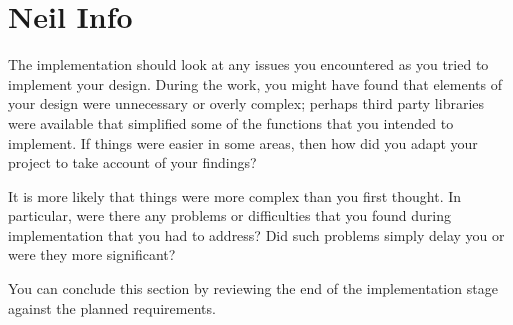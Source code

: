 \section{Neil Info}

The implementation should look at any issues you encountered as you tried to implement your design. During the work, you might have found that elements of your design were unnecessary or overly complex; perhaps third party libraries were available that simplified some of the functions that you intended to implement. If things were easier in some areas, then how did you adapt your project to take account of your findings?

It is more likely that things were more complex than you first thought. In particular, were there any problems or difficulties that you found during implementation that you had to address? Did such problems simply delay you or were they more significant? 

You can conclude this section by reviewing the end of the implementation stage against the planned requirements. 
